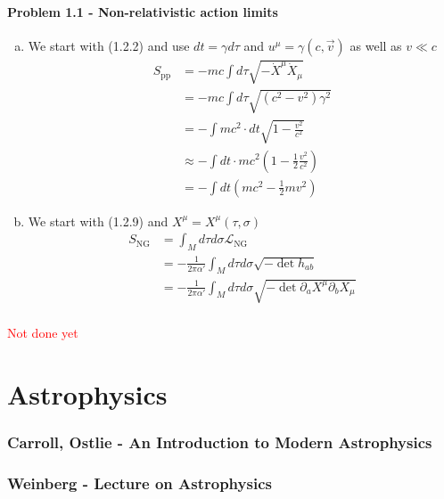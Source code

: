 \documentclass[10pt,a4paper]{book}
\theoremstyle{definition}
\begin{document}
\subsubsection{Problem 1.1 - Non-relativistic action limits}
\begin{enumerate}[(a)]
    \item We start with (1.2.2) and use $dt=\gamma d\tau$ and $u^\mu=\gamma(c,\vec{v})$ as well as $v\ll c$
    \begin{align}
        S_\text{pp}&=-mc\int d\tau\sqrt{-\dot X^\mu\dot X_\mu}\\
        &=-mc\int d\tau\sqrt{(c^2-v^2)\gamma^2}\\
        &=-\int mc^2\cdot dt\sqrt{1-\frac{v^2}{c^2}}\\
        &\approx-\int dt\cdot mc^2\left(1-\frac{1}{2}\frac{v^2}{c^2}\right)\\
        &=-\int dt\left(mc^2-\frac{1}{2}mv^2\right)
    \end{align}
    
    \item We start with (1.2.9) and $X^\mu=X^\mu(\tau,\sigma)$
    \begin{align}
        S_\text{NG}
        &=\int_Md\tau d\sigma \mathcal{L}_\text{NG}\\
        &=-\frac{1}{2\pi\alpha'}\int_Md\tau d\sigma \sqrt{-\det h_{ab}}\\
        &=-\frac{1}{2\pi\alpha'}\int_Md\tau d\sigma \sqrt{-\det \partial_aX^\mu\partial_bX_\mu}\\
    \end{align}
    
\end{enumerate}

\textcolor{red}{Not done yet}

\chapter{Astrophysics}
\subsection{{\sc Carroll, Ostlie} - An Introduction to Modern Astrophysics}
\subsection{{\sc Weinberg} - Lecture on Astrophysics}
\end{document}
